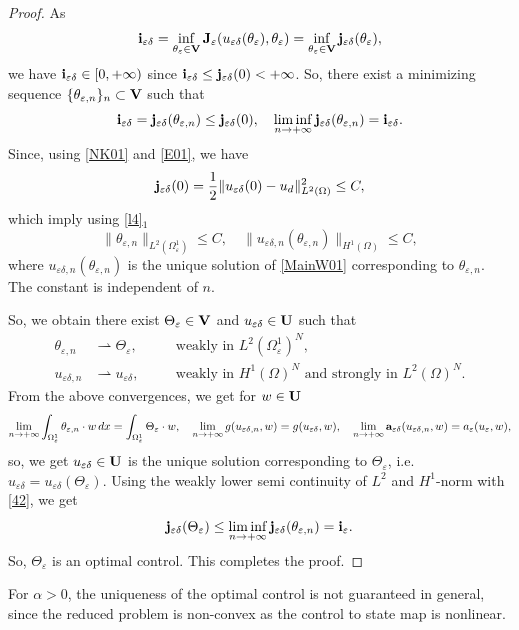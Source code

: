 \documentclass[11pt,a4paper]{article}
\numberwithin{equation}{section}
\def\O{\Omega}
\def\e{\varepsilon}
\def\a{{\alpha}}
\def\Ga{{\bf a}}
\def\ed{{\varepsilon\delta}}
\def\Ga{{\bf a}}
\def\Gi{{\bf i}}
\def\Gj{{\bf j}}
\def\GJ{{\bf J}}
\def\GU{{\bf U}}
\def\GV{{\bf V}}
\begin{document}
\begin{proof}
As
		$$\Gi_\ed=\inf_{\theta_\e\in\GV}\GJ_\e(u_\ed(\theta_\e),\theta_\e)=\inf_{\theta_\e\in\GV}\Gj_\ed(\theta_\e),$$
		we have $\Gi_\ed\in [0,+\infty)$ since $\Gi_\ed\leq \Gj_\ed(0)<+\infty$. So, there exist a minimizing sequence $\{\theta_{\e,n}\}_{n}\subset\GV$ such that
		\begin{equation}\label{42}
				\Gi_\ed=\Gj_\ed(\theta_{\e,n})\leq \Gj_\ed(0),\quad \liminf_{n\to+\infty}\Gj_\ed(\theta_{\e,n})=\Gi_\ed.
			\end{equation}
		Since, using \eqref{NK01} and \eqref{E01}, we have
		$$\Gj_\ed(0)={1\over 2}\|u_\ed(0)-u_d\|^2_{L^2(\O)}\leq C,$$
		which imply using \eqref{l4}$_1$
		\begin{equation*}
				\|\theta_{\e,n}\|_{L^2(\O^1_\e)}\leq C ,\quad \|u_{\ed,n}(\theta_{\e,n})\|_{H^1(\O)}\leq C,
			\end{equation*}
		where $u_{\ed,n}(\theta_{\e,n})$ is the unique solution of \eqref{MainW01} corresponding to $\theta_{\e,n}$.
		The constant is independent of $n$. 
		
		So, we obtain there exist $\Theta_\e\in\GV$ and $u_\ed\in\GU$ such that
		\begin{equation*}
				\begin{aligned}
						\theta_{\e,n} &\rightharpoonup \Theta_\e,\quad &&\text{weakly in $L^2(\O^1_\e)^N$},\\
						u_{\ed,n} &\rightharpoonup u_\ed,\quad &&\text{weakly in $H^1(\O)^N$ and strongly in $L^2(\O)^N$}.
					\end{aligned} 
			\end{equation*}
		From the above convergences, we get for $w\in\GU$
		\begin{equation*}
				\lim_{n\to+\infty}\int_{\O^1_\e}\theta_{\e,n}\cdot w\,dx=\int_{\O^1_\e} \Theta_\e\cdot w,\quad \lim_{n\to+\infty}g(u_{\ed,n},w)=g(u_\ed,w),\quad \lim_{n\to+\infty}\Ga_\ed(u_{\ed,n},w)=a_\e(u_\e,w),
			\end{equation*}
		so, we get $u_\ed\in\GU$ is the unique solution corresponding to $\Theta_\e$, i.e. $u_\ed=u_\ed(\Theta_\e)$. Using the weakly lower semi continuity of $L^2$ and $H^1$-norm with \eqref{42}, we get 
		$$\Gj_\ed(\Theta_\e)\leq\liminf_{n\to+\infty}\Gj_\ed(\theta_{\e,n})=\Gi_\e.$$
		So, $\Theta_\e$ is an optimal control. This completes the proof.
\end{proof}
For $\a>0$, the uniqueness of the optimal control is not guaranteed in general, since the reduced problem is non-convex as the control to state map is nonlinear.
\end{document}
